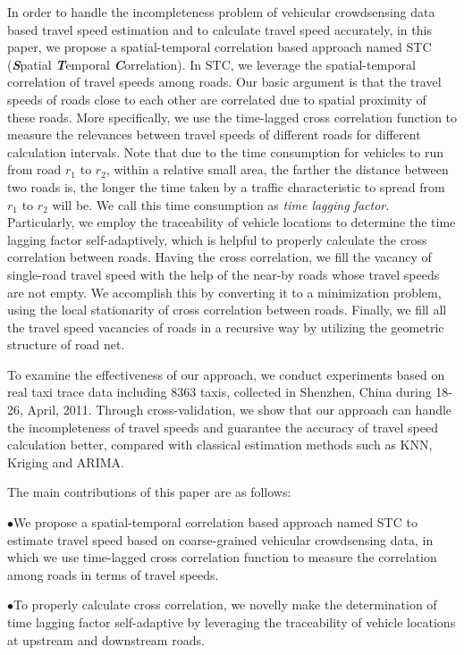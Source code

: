 \documentclass[twocolumn,10pt,final,conference]{IEEEtran}
\begin{document}
In order to handle the incompleteness problem of vehicular crowdsensing data based travel speed estimation and to calculate travel speed accurately, in this paper, we propose a spatial-temporal correlation based approach named STC (\emph{\bf{S}}patial \emph{\bf{T}}emporal \emph{\bf{C}}orrelation). In STC, we leverage the spatial-temporal correlation of travel speeds among roads. Our basic argument is that the  travel speeds of roads close to each other are correlated due to spatial proximity of these roads. More specifically, we use the time-lagged cross correlation function to measure the relevances between travel speeds of different roads for different calculation intervals. Note that due to the time consumption for vehicles to run from road $r_{1}$ to $r_{2}$, within a relative small area, the farther the distance between two roads is, the longer the time taken by a traffic characteristic to spread from $r_{1}$ to $r_{2}$ will be. We call this time consumption as \emph{time lagging factor}. Particularly, we employ the traceability of vehicle locations to determine the time lagging factor self-adaptively, which is helpful to properly calculate the cross correlation between roads. Having the cross correlation, we fill the vacancy of single-road travel speed with the help of the near-by roads whose travel speeds are not empty. We accomplish this by converting it to a minimization problem, using the local stationarity of cross correlation between roads. Finally, we fill all the travel speed vacancies of roads in a recursive way by utilizing the geometric structure of road net.

To examine the effectiveness of our approach, we conduct experiments based on real taxi trace data including 8363 taxis, collected in Shenzhen, China during 18-26, April, 2011. Through cross-validation, we show that our approach can handle the incompleteness of travel speeds and guarantee the accuracy of travel speed calculation better, compared with classical estimation methods such as KNN, Kriging and ARIMA.

The main contributions of this paper are as follows:

$\bullet$We propose a spatial-temporal correlation based approach named STC to estimate travel speed based on coarse-grained vehicular crowdsensing data, in which we use time-lagged cross correlation function to measure the correlation among roads in terms of travel speeds.

$\bullet$To properly calculate cross correlation, we novelly  make the determination of time lagging factor self-adaptive by leveraging the traceability of vehicle locations at upstream and downstream roads.
\end{document}

